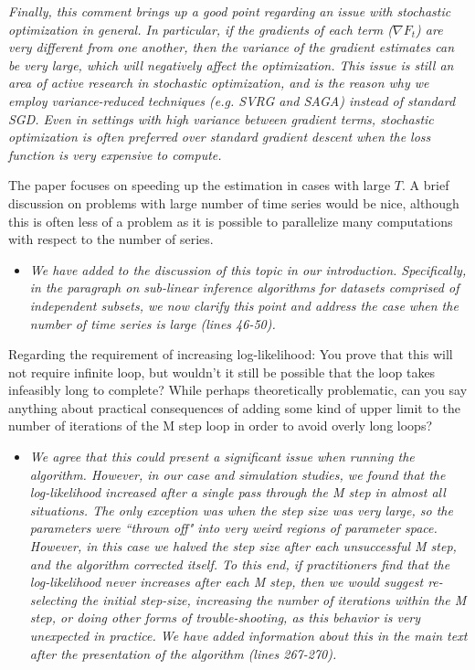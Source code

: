 \documentclass[11pt]{article}
\begin{document}
\begin{itemize}
    \textit{Finally, this comment brings up a good point regarding an issue with stochastic optimization in general. In particular, if the gradients of each term ($\nabla F_t$) are very different from one another, then the variance of the gradient estimates can be very large, which will negatively affect the optimization. This issue is still an area of active research in stochastic optimization, and is the reason why we employ variance-reduced techniques (e.g. SVRG and SAGA) instead of standard SGD. Even in settings with high variance between gradient terms, stochastic optimization is often preferred over standard gradient descent when the loss function is very expensive to compute.}
\end{itemize}

The paper focuses on speeding up the estimation in cases with large $T$. A brief discussion on problems with large number of time series would be nice, although this is often less of a problem as it is possible to parallelize many computations with respect to the number of series.

\begin{itemize}
    \item \textit{We have added to the discussion of this topic in our introduction. Specifically, in the paragraph on sub-linear inference algorithms for datasets comprised of independent subsets, we now  clarify this point and address the case when the number of time series is large (lines 46-50).}
\end{itemize}

Regarding the requirement of increasing log-likelihood: You prove that this will not require infinite loop, but wouldn't it still be possible that the loop takes infeasibly long to complete? While perhaps theoretically problematic, can you say anything about practical consequences of adding some kind of upper limit to the number of iterations of the M step loop in order to avoid overly long loops? 

\begin{itemize}
    \item \textit{We agree that this could present a significant issue when running the algorithm. However, in our case and simulation studies, we found that the log-likelihood increased after a single pass through the M step in almost all situations. The only exception was when the step size was very large, so the parameters were ``thrown off" into very weird regions of parameter space. However, in this case we halved the step size after each unsuccessful M step, and the algorithm corrected itself. To this end, if practitioners find that the log-likelihood never increases after each M step, then we would suggest re-selecting the initial step-size, increasing the number of iterations within the M step, or doing other forms of trouble-shooting, as this behavior is very unexpected in practice. We have added information about this in the main text after the presentation of the algorithm (lines 267-270).}
\end{itemize}
\end{document}
